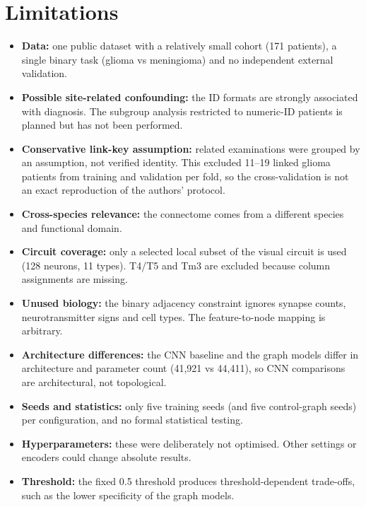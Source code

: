 \section{Limitations}
\label{sec:07_limitations}

\begin{itemize}
\item \textbf{Data:} one public dataset with a relatively small cohort (171 patients), a single binary task (glioma vs meningioma) and no independent external validation.
\item \textbf{Possible site-related confounding:} the ID formats are strongly associated with diagnosis. The subgroup analysis restricted to numeric-ID patients is planned but has not been performed.
\item \textbf{Conservative link-key assumption:} related examinations were grouped by an assumption, not verified identity. This excluded 11–19 linked glioma patients from training and validation per fold, so the cross-validation is not an exact reproduction of the authors' protocol.
\item \textbf{Cross-species relevance:} the connectome comes from a different species and functional domain.
\item \textbf{Circuit coverage:} only a selected local subset of the visual circuit is used (128 neurons, 11 types). T4/T5 and Tm3 are excluded because column assignments are missing.
\item \textbf{Unused biology:} the binary adjacency constraint ignores synapse counts, neurotransmitter signs and cell types. The feature-to-node mapping is arbitrary.
\item \textbf{Architecture differences:} the CNN baseline and the graph models differ in architecture and parameter count (41,921 vs 44,411), so CNN comparisons are architectural, not topological.
\item \textbf{Seeds and statistics:} only five training seeds (and five control-graph seeds) per configuration, and no formal statistical testing.
\item \textbf{Hyperparameters:} these were deliberately not optimised. Other settings or encoders could change absolute results.
\item \textbf{Threshold:} the fixed 0.5 threshold produces threshold-dependent trade-offs, such as the lower specificity of the graph models.
\end{itemize}
